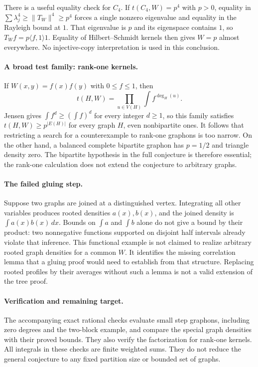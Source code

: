 \documentclass[11pt]{article}
\begin{document}
There is a useful equality check for $C_4$. If $t(C_4,W)=p^4$ with
$p>0$, equality in
$\sum\lambda_j^4\ge\|T_W\|^4\ge p^4$ forces a single nonzero
eigenvalue and equality in the Rayleigh bound at $1$.
That eigenvalue is $p$ and its eigenspace contains $1$, so
$T_Wf=p\langle f,1\rangle1$. Equality of Hilbert--Schmidt kernels
then gives $W=p$ almost everywhere. No injective-copy interpretation
is used in this conclusion.

\paragraph{A broad test family: rank-one kernels.}
If $W(x,y)=f(x)f(y)$ with $0\le f\le1$, then
\[
                  t(H,W)=\prod_{u\in V(H)}\int f^{\deg_H(u)}.
\]
Jensen gives $\int f^d\ge(\int f)^d$ for every integer $d\ge1$,
so this family satisfies $t(H,W)\ge p^{|E(H)|}$ for every graph $H$,
even nonbipartite ones. It follows that restricting a search for a
counterexample to rank-one graphons is too narrow.
On the other hand, a balanced complete bipartite graphon has $p=1/2$
and triangle density zero. The bipartite hypothesis in the full
conjecture is therefore essential; the rank-one calculation does not
extend the conjecture to arbitrary graphs.

\paragraph{The failed gluing step.}
Suppose two graphs are joined at a distinguished vertex. Integrating
all other variables produces rooted densities $a(x),b(x)$, and the
joined density is $\int a(x)b(x)\,dx$. Bounds on $\int a$ and $\int b$
alone do not give a bound by their product: two nonnegative functions
supported on disjoint half intervals already violate that inference.
This functional example is not claimed to realize arbitrary rooted
graph densities for a common $W$. It identifies the missing correlation
lemma that a gluing proof would need to establish from that structure.
Replacing rooted profiles by their averages without such a lemma is
not a valid extension of the tree proof.

\paragraph{Verification and remaining target.}
The accompanying exact rational checks evaluate small step graphons,
including zero degrees and the two-block example, and compare the
special graph densities with their proved bounds. They also verify
the factorization for rank-one kernels. All integrals in these checks
are finite weighted sums. They do not reduce the general conjecture to
any fixed partition size or bounded set of graphs.
\end{document}
